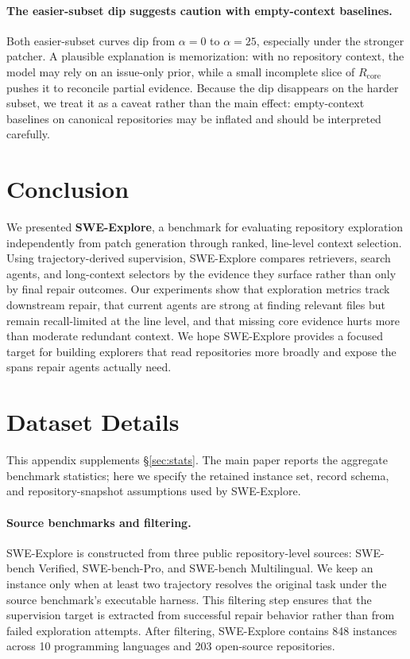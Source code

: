 \documentclass{llmxive}
\begin{document}
\vspace{-3mm}
\paragraph{The easier-subset dip suggests caution with empty-context baselines.}
Both easier-subset curves dip from $\alpha{=}0$ to $\alpha{=}25$, especially under the stronger patcher. A plausible explanation is memorization: with no repository context, the model may rely on an issue-only prior, while a small incomplete slice of $R_{\text{core}}$ pushes it to reconcile partial evidence. Because the dip disappears on the harder subset, we treat it as a caveat rather than the main effect: empty-context baselines on canonical repositories may be inflated and should be interpreted carefully.


\section{Conclusion}

We presented \textbf{SWE-Explore}, a benchmark for evaluating repository exploration independently from patch generation through ranked, line-level context selection. Using trajectory-derived supervision, SWE-Explore compares retrievers, search agents, and long-context selectors by the evidence they surface rather than only by final repair outcomes. Our experiments show that exploration metrics track downstream repair, that current agents are strong at finding relevant files but remain recall-limited at the line level, and that missing core evidence hurts more than moderate redundant context. We hope SWE-Explore provides a focused target for building explorers that read repositories more broadly and expose the spans repair agents actually need.






\appendix
\appendix

\section{Dataset Details}
\label{app:datasets}

This appendix supplements \S\ref{sec:stats}. The main paper reports the aggregate
benchmark statistics; here we specify the retained instance set, record schema,
and repository-snapshot assumptions used by SWE-Explore.

\paragraph{Source benchmarks and filtering.}
SWE-Explore is constructed from three public repository-level sources:
SWE-bench Verified, SWE-bench-Pro, and SWE-bench Multilingual. We keep an
instance only when at least two trajectory resolves the
original task under the source benchmark's executable harness. This filtering
step ensures that the supervision target is extracted from successful repair
behavior rather than from failed exploration attempts. After filtering,
SWE-Explore contains 848 instances across 10 programming languages and 203
open-source repositories.
\end{document}
